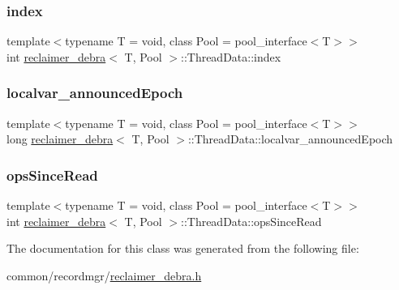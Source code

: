 \subsubsection{\texorpdfstring{index}{index}}
{\footnotesize\ttfamily template$<$typename T  = void, class Pool  = pool\+\_\+interface$<$\+T$>$$>$ \\
int \hyperlink{classreclaimer__debra}{reclaimer\+\_\+debra}$<$ T, Pool $>$\+::Thread\+Data\+::index}

\mbox{\label{classreclaimer__debra_1_1ThreadData_a7b5c0008c0e0d93d36d0ff6222509963}} 
\subsubsection{\texorpdfstring{localvar\+\_\+announced\+Epoch}{localvar\_announcedEpoch}}
{\footnotesize\ttfamily template$<$typename T  = void, class Pool  = pool\+\_\+interface$<$\+T$>$$>$ \\
long \hyperlink{classreclaimer__debra}{reclaimer\+\_\+debra}$<$ T, Pool $>$\+::Thread\+Data\+::localvar\+\_\+announced\+Epoch}

\mbox{\label{classreclaimer__debra_1_1ThreadData_ad35a3f25b69dcdf78c2e4979b65c9e32}} 
\subsubsection{\texorpdfstring{ops\+Since\+Read}{opsSinceRead}}
{\footnotesize\ttfamily template$<$typename T  = void, class Pool  = pool\+\_\+interface$<$\+T$>$$>$ \\
int \hyperlink{classreclaimer__debra}{reclaimer\+\_\+debra}$<$ T, Pool $>$\+::Thread\+Data\+::ops\+Since\+Read}



The documentation for this class was generated from the following file\+:\begin{DoxyCompactItemize}
\item 
common/recordmgr/\hyperlink{reclaimer__debra_8h}{reclaimer\+\_\+debra.\+h}\end{DoxyCompactItemize}
